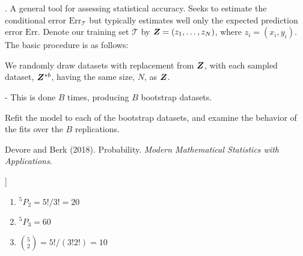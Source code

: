\documentclass[11pt]{article}
\begin{document}
\myspace
\p {}. A general tool for assessing statistical accuracy. Seeks to estimate the conditional error $\text{Err}_{\mathcal{T}}$ but typically estimates well only the expected prediction error $\text{Err}$. Denote our training set $\mathcal{T}$ by $\bm{Z}_{} = (z_1, \ldots, z_N)$, where $z_i = (x_i, y_i)$. The basic procedure is as follows:
\begin{compactenum} 
	\item We randomly draw datasets with replacement from $\bm{Z}_{}$, with each sampled dataset, $\bm{Z}_{}^{*b}$, having the same size, $N$, as $\bm{Z}_{}$. 
	
	\subitem- This is done $B$ times, producing $B$ bootstrap datasets.
	
	\item Refit the model to each of the bootstrap datasets, and examine the behavior of the fits over the $B$ replications.
\end{compactenum}

















\label{Modern Mathematical Statistics with Applications}

\vspace{-1.7em}
{\scriptsize Devore and Berk (2018). Probability. \textit{Modern Mathematical Statistics with Applications}.\\ }

\newcommand\perm[2]{{}^{#1}\!P_{#2}}

\begin{example}[Exercise 31 \green[correct]]
	\begin{enumerate}[label=(\alph*)]
		\item $\perm{5}{2} = 5!/3! = 20$
		\item $\perm{5}{3} = 60$
		\item ${5 \choose 2} = 5!/(3!2!) = 10$
	\end{enumerate}
\end{example}
\end{document}

